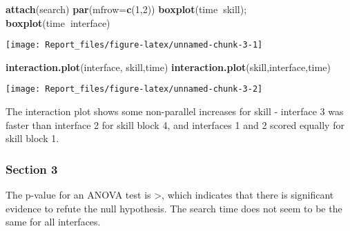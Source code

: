 \documentclass[]{article}
\newenvironment{Shaded}{\begin{snugshade}}{\end{snugshade}}
\newcommand{\KeywordTok}[1]{\textcolor[rgb]{0.13,0.29,0.53}{\textbf{#1}}}
\newcommand{\DataTypeTok}[1]{\textcolor[rgb]{0.13,0.29,0.53}{#1}}
\newcommand{\DecValTok}[1]{\textcolor[rgb]{0.00,0.00,0.81}{#1}}
\newcommand{\StringTok}[1]{\textcolor[rgb]{0.31,0.60,0.02}{#1}}
\newcommand{\OperatorTok}[1]{\textcolor[rgb]{0.81,0.36,0.00}{\textbf{#1}}}
\newcommand{\NormalTok}[1]{#1}
\begin{document}
\begin{Shaded}
\begin{Highlighting}[]
\KeywordTok{attach}\NormalTok{(search)}
\KeywordTok{par}\NormalTok{(}\DataTypeTok{mfrow=}\KeywordTok{c}\NormalTok{(}\DecValTok{1}\NormalTok{,}\DecValTok{2}\NormalTok{))}
\KeywordTok{boxplot}\NormalTok{(time}\OperatorTok{~}\NormalTok{skill); }\KeywordTok{boxplot}\NormalTok{(time}\OperatorTok{~}\NormalTok{interface)}
\end{Highlighting}
\end{Shaded}

\begin{center}\texttt{[image: Report\_files/figure-latex/unnamed-chunk-3-1]} \end{center}

\begin{Shaded}
\begin{Highlighting}[]
\KeywordTok{interaction.plot}\NormalTok{(interface, skill,time)}
\KeywordTok{interaction.plot}\NormalTok{(skill,interface,time)}
\end{Highlighting}
\end{Shaded}

\begin{center}\texttt{[image: Report\_files/figure-latex/unnamed-chunk-3-2]} \end{center}

The interaction plot shows some non-parallel increases for skill -
interface 3 was faster than interface 2 for skill block 4, and
interfaces 1 and 2 scored equally for skill block 1.

\subsubsection{Section 3}\label{section-3}

\begin{Shaded}
\end{Shaded}

The p-value for an ANOVA test is \textgreater{}, which indicates that
there is significant evidence to refute the null hypothesis. The search
time does not seem to be the same for all interfaces.
\end{document}
